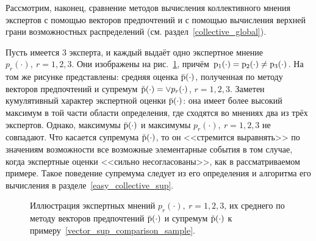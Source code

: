 Рассмотрим, наконец, сравнение методов вычисления коллективного мнения экспертов с помощью векторов предпочтений и с помощью вычисления верхней грани возможностных распределений (см. раздел~\ref{collective_global}).
\begin{example}
\label{vector_sup_comparison_sample}
Пусть имеется $3$ эксперта, и каждый выдаёт одно экспертное мнение $p_r(\cdot),\ r=1,2,3$. Они изображены на рис.~\ref{vector_sup_comparison_pic}, причём ${\mathrm{p}}_1(\cdot) = {\mathrm{p}}_2(\cdot) \neq {\mathrm{p}}_3(\cdot)$. На том же рисунке представлены: средняя оценка $\bar{{\mathrm{p}}}(\cdot)$, полученная по методу векторов предпочтений и супремум $\check{{\mathrm{p}}}(\cdot) = \vee p_r(\cdot)$, $r=1,2,3$. Заметен кумулятивный характер экспертной оценки $\bar{{\mathrm{p}}}(\cdot)$: она имеет более высокий максимум в той части области определения, где сходятся во мнениях два из трёх экспертов. Однако, максимумы $\bar{{\mathrm{p}}}(\cdot)$ и максимумы $p_r(\cdot),\ r=1,2,3$ не совпадают. Что касается супремума $\check{{\mathrm{p}}}(\cdot)$, то он <<стремится выравнять>> по значениям возможности все возможные элементарные события в том случае, когда экспертные оценки <<сильно несогласованы>>, как в рассматриваемом примере. Такое поведение супремума следует из его определения и алгоритма его вычисления в разделе~\ref{easy_collective_sup}.  
\end{example}

\begin{figure}[h]
\caption{\small Иллюстрация экспертных мнений $p_r(\cdot),\ r=1,2,3$, их среднего по методу векторов предпочтений $\bar{{\mathrm{p}}}(\cdot)$ и супремум $\check{{\mathrm{p}}}(\cdot)$ к примеру~\ref{vector_sup_comparison_sample}.}
\label{vector_sup_comparison_pic}
\end{figure}

